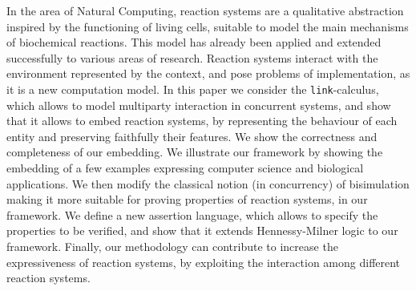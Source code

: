 
In the area of Natural Computing, reaction systems are
a qualitative abstraction inspired by the 
functioning of living cells, suitable to model the main
mechanisms of biochemical reactions.
This model has already been applied
and extended successfully to various areas of research. Reaction 
systems interact with the environment represented by the context, and
pose problems of implementation, as it is a new computation model. 
In this paper we consider the {\tt link}-calculus, which allows to model 
multiparty interaction in concurrent systems, and show that it allows to
embed reaction systems, by representing the behaviour of each entity and
preserving faithfully their features. 
We show the correctness and completeness 
of our embedding.
We illustrate our framework by showing the embedding of 
a few examples expressing computer science
and biological applications.
We then modify the classical notion (in concurrency) of bisimulation
making it more suitable for proving properties of reaction systems, in our
framework.
We define a new assertion language, which allows to specify
the properties to be verified, and show that it extends Hennessy-Milner logic
to our framework.
Finally, our methodology can contribute to increase the expressiveness
of reaction systems, by exploiting the interaction among 
different reaction systems.
